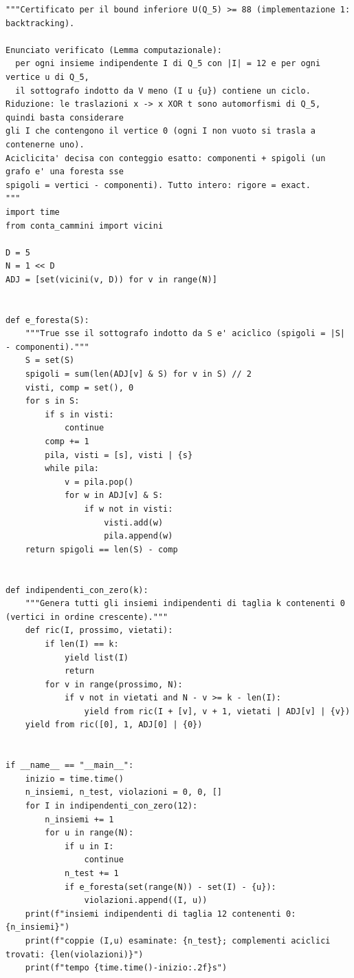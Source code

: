 \documentclass[11pt,a4paper]{article}
\begin{document}
\begin{lstlisting}[caption={attempt\_001 code\_2 [python, rigore exact] — Certificate 1 for the lower bound: enumerate all independent 12-sets of Q\_5 containing ver — approvato dal Referee}]
"""Certificato per il bound inferiore U(Q_5) >= 88 (implementazione 1: backtracking).

Enunciato verificato (Lemma computazionale):
  per ogni insieme indipendente I di Q_5 con |I| = 12 e per ogni vertice u di Q_5,
  il sottografo indotto da V meno (I u {u}) contiene un ciclo.
Riduzione: le traslazioni x -> x XOR t sono automorfismi di Q_5, quindi basta considerare
gli I che contengono il vertice 0 (ogni I non vuoto si trasla a contenerne uno).
Aciclicita' decisa con conteggio esatto: componenti + spigoli (un grafo e' una foresta sse
spigoli = vertici - componenti). Tutto intero: rigore = exact.
"""
import time
from conta_cammini import vicini

D = 5
N = 1 << D
ADJ = [set(vicini(v, D)) for v in range(N)]


def e_foresta(S):
    """True sse il sottografo indotto da S e' aciclico (spigoli = |S| - componenti)."""
    S = set(S)
    spigoli = sum(len(ADJ[v] & S) for v in S) // 2
    visti, comp = set(), 0
    for s in S:
        if s in visti:
            continue
        comp += 1
        pila, visti = [s], visti | {s}
        while pila:
            v = pila.pop()
            for w in ADJ[v] & S:
                if w not in visti:
                    visti.add(w)
                    pila.append(w)
    return spigoli == len(S) - comp


def indipendenti_con_zero(k):
    """Genera tutti gli insiemi indipendenti di taglia k contenenti 0 (vertici in ordine crescente)."""
    def ric(I, prossimo, vietati):
        if len(I) == k:
            yield list(I)
            return
        for v in range(prossimo, N):
            if v not in vietati and N - v >= k - len(I):
                yield from ric(I + [v], v + 1, vietati | ADJ[v] | {v})
    yield from ric([0], 1, ADJ[0] | {0})


if __name__ == "__main__":
    inizio = time.time()
    n_insiemi, n_test, violazioni = 0, 0, []
    for I in indipendenti_con_zero(12):
        n_insiemi += 1
        for u in range(N):
            if u in I:
                continue
            n_test += 1
            if e_foresta(set(range(N)) - set(I) - {u}):
                violazioni.append((I, u))
    print(f"insiemi indipendenti di taglia 12 contenenti 0: {n_insiemi}")
    print(f"coppie (I,u) esaminate: {n_test}; complementi aciclici trovati: {len(violazioni)}")
    print(f"tempo {time.time()-inizio:.2f}s")

\end{lstlisting}
\end{document}
